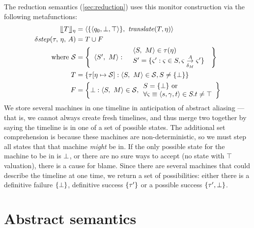 The reduction semantics (\autoref{sec:reduction}) uses this monitor construction via the following metafunctions:
\begin{align*}
  \compile{\mtcon}{\mtimeline} &= \npmsm{\setof{\pmsmstate{\pmsmq_0, \bot, \top}}}{\translateeps(\mtcon, \mtimeline)} \\
  \sstep{\mTMons}{\mtimeline}{\mevent} &= T \cup F \\
    \text{where } {\mathcal S} &= \left\{
\ensuremath{
      \begin{array}{ll}
        \npmsm{S'}{\pmsmMachine} : &
        \begin{array}{l}
\npmsm{S}{\pmsmMachine} \in     \mTMons(\mtimeline) \\
 S' = \setbuild{\mstate'}{\mstate \in S, \mstate \pmsmstepd{\mevent}{\delta_\pmsmMachine} \mstate'}
\end{array}
      \end{array}
}\right\}
\\\phantom{\text{where }} T &= \setbuild{\mTMons[\mtimeline \mapsto {\mathcal S}]}{\npmsm{S}{\pmsmMachine} \in {\mathcal S}, S \neq \setof{\stfail}}
\\\phantom{\text{where }} F &= \left\{\stfail : \npmsm{S}{\pmsmMachine} \in {\mathcal S},
  \begin{array}{l}
S = \setof{\stfail} \text{ or } \\
\forall \mstate\equiv\pmsmstate{\pmsmqq, \mbindenv, t}\in S. t \neq \top
\end{array}\right\}
\end{align*}
We store several machines in one timeline in anticipation of abstract aliasing --- that is, we cannot always create fresh timelines, and thus merge two together by saying the timeline is in one of a set of possible states.
%
The additional set comprehension is because these machines are non-deterministic, so we must step all states that that machine \emph{might} be in.
%
If the only possible state for the machine to be in is $\bot$, or there are no sure ways to accept (no state with $\top$ valuation), there is a cause for blame.
%
Since there are several machines that could describe the timeline at one time, we return a set of possibilities: either there is a definitive failure $\{\bot\}$, definitive success $\{\tau'\}$ or a possible success $\{\tau', \bot\}$.

\section{Abstract semantics}

